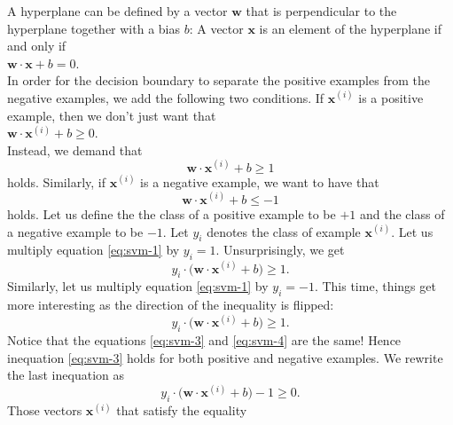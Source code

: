 A hyperplane can be defined by a vector $\mathbf{w}$ that is perpendicular to the hyperplane together with a
bias $b$:  A vector $\mathbf{x}$ is an element of the hyperplane if and only if
\\[0.2cm]
\hspace*{1.3cm}
$\mathbf{w} \cdot \mathbf{x} + b = 0$.
\\[0.2cm]
In order for the decision boundary to separate the positive examples from the negative examples, we add the
following two conditions.  If $\mathbf{x}^{(i)}$ is a positive example, then we don't just want that 
\\[0.2cm]
\hspace*{1.3cm}
$\mathbf{w} \cdot \mathbf{x}^{(i)} + b \geq 0$.
\\[0.2cm]
Instead, we demand that 
\begin{equation}
  \label{eq:svm-1}
  \mathbf{w} \cdot \mathbf{x}^{(i)} + b \geq 1
\end{equation}
holds.  Similarly, if $\mathbf{x}^{(i)}$ is a negative example, we want to have that
\begin{equation}
  \label{eq:svm-2}
    \mathbf{w} \cdot \mathbf{x}^{(i)} + b \leq -1
\end{equation}
holds.  Let us define the the class of a positive example to be $+1$ and the
class of a negative example to be $-1$.  Let $y_i$ denotes the class of example $\mathbf{x}^{(i)}$.
Let us multiply equation \ref{eq:svm-1} by $y_i = 1$.  Unsurprisingly, we get
\begin{equation}
  \label{eq:svm-3}
  y_i \cdot \bigl(\mathbf{w} \cdot \mathbf{x}^{(i)} + b) \geq 1.
\end{equation}
Similarly, let us multiply equation \ref{eq:svm-1} by $y_i = -1$.  This time, things get more interesting
as the direction of the inequality is flipped:
\begin{equation}
  \label{eq:svm-4}
    y_i \cdot \bigl(\mathbf{w} \cdot \mathbf{x}^{(i)} + b) \geq 1.
\end{equation}
Notice that the equations \ref{eq:svm-3} and \ref{eq:svm-4} are the same!  Hence
inequation \ref{eq:svm-3} holds for both positive and negative examples.  We rewrite the last inequation as
\begin{equation}
  \label{eq:svm-5}
    y_i \cdot \bigl(\mathbf{w} \cdot \mathbf{x}^{(i)} + b\bigr) - 1 \geq 0.
\end{equation}
Those vectors $\mathbf{x}^{(i)}$ that satisfy the equality
\\[0.2cm]
\hspace*{1.3cm}
